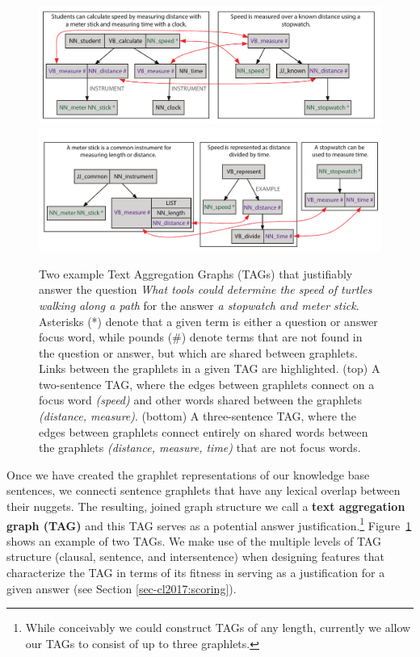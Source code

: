 \begin{figure}[t!]
\begin{center}

\includegraphics[width=115mm]{mainmatter/tacl2015-tig/tag_connection_example2.pdf}
\includegraphics[width=115mm]{mainmatter/tacl2015-tig/tag_example2.pdf}

\caption{
Two example Text Aggregation Graphs (TAGs) that justifiably answer the question \emph{What tools could determine the speed of turtles walking along a path} for the answer \emph{a stopwatch and meter stick}. Asterisks (*) denote that a given term is either a question or answer focus word, while pounds (\#) denote terms that are not found in the question or answer, but which are shared between graphlets.  Links between the graphlets in a given TAG are highlighted. (top) A two-sentence TAG, where the edges between graphlets connect on a focus word \emph{(speed)} and other words shared between the graphlets \emph{(distance, measure)}. (bottom) A three-sentence TAG, where the edges between graphlets connect entirely on shared words between the graphlets \emph{(distance, measure, time)} that are not focus words.
}
\label{fig:tag_example}
\end{center}
\end{figure}


Once we have created the graphlet representations of our knowledge base sentences, we connecti sentence graphlets that have any lexical overlap between their nuggets.  The resulting, joined graph structure we call a \textbf{text aggregation graph (TAG)} and this TAG serves as a potential answer justification.\footnote{While conceivably we could construct TAGs of any length, currently we allow our TAGs to consist of up to three graphlets.}
Figure~\ref{fig:tag_example} shows an example of two TAGs. 
We make use of the multiple levels of TAG structure (clausal, sentence, and intersentence) when designing features that characterize the TAG in terms of its fitness in serving as a justification for a given answer (see Section \ref{sec-cl2017:scoring}).

